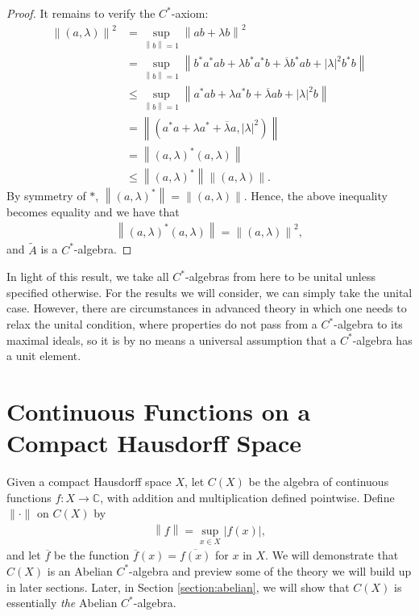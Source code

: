 \documentclass[11pt,a4paper]{report}
\theoremstyle{plain}
\theoremstyle{definition}
\newcommand{\1}{\mathbbm{1}}
\newcommand{\C}{\mathbb{C}}
\newcommand{\CX}{C(X)}
\begin{document}
\begin{proof}
	It remains to verify the $C^\ast$-axiom:
	\begin{align*}
				\left\|(a,\lambda)\right\|^2 
		&=		\sup_{\left\|b\right\|=1}{\left\| ab+\lambda b\right \|^2}						\\
		&=		\sup_{\left\|b\right\|=1}{\left\| b^\ast a^\ast ab 
								+\lambda b^\ast a^\ast b
								+\overline{\lambda}b^\ast a b 
								+|\lambda|^2 b^\ast b \right\|}									\\
		&\leq	\sup_{\left\|b\right\|=1}{\left\| a^\ast ab 
								+\lambda a^\ast b
								+\overline{\lambda}a b
								+\left|\lambda\right|^2 b\right\|}								\\
		&=		\left\|(a^\ast a + \lambda a^\ast +\overline{\lambda}a,|\lambda|^2)\right\|		\\
		&= 		\left\|(a,\lambda)^\ast(a,\lambda)\right\|										\\
		&\leq	\left\|(a,\lambda)^\ast\right\| \left\|(a,\lambda)\right\|.
	\end{align*}
	By symmetry of $\ast$, $\left\|(a,\lambda)^\ast\right\| = \left\|(a,\lambda)\right\|$. 
	Hence, the above inequality becomes equality and we have that
	\begin{align*}
		\left\|(a,\lambda)^\ast(a,\lambda)\right\| = \left\|(a,\lambda)\right\|^2,
	\end{align*}
	and $\tilde A$ is a $C^\ast$-algebra.
\end{proof}

In light of this result, we take all $C^\ast$-algebras from here to be unital 
unless specified otherwise. For the results we will consider, we can simply take 
the unital case. However, there are circumstances in advanced theory in which 
one needs to relax the unital condition, where properties do not pass from a 
$C^\ast$-algebra to its maximal ideals, so it is by no means a universal 
assumption that a $C^\ast$-algebra has a unit element.


\section{Continuous Functions on a Compact Hausdorff Space} \label{section:CX}
Given a compact Hausdorff space $X$, let $\CX$ be the algebra of continuous 
functions $f:X\to\C$, with addition and multiplication defined pointwise. 
Define $\|\cdot\|$ on $\CX$ by
\begin{align*}
	\left\|f\right\|= \sup_{x\in X}{\left|f(x)\right|},
\end{align*}
and let $\overline f$ be the function $\overline f(x) = \overline{f(x)}$ for 
$x$ in $X$. We will demonstrate that $\CX$ is an Abelian $C^\ast$-algebra and 
preview some of the theory we will build up in later sections. Later, in 
Section \ref{section:abelian}, we will show that $\CX$ is essentially \emph{the} 
Abelian $C^\ast$-algebra.
\end{document}
